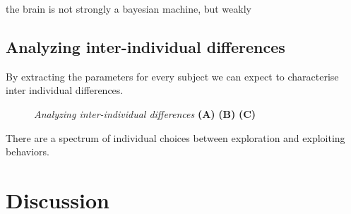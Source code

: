 \documentclass[profile,final,english, draft]{article}%
\begin{document}
the brain is not strongly a bayesian machine, but weakly



\subsection{Analyzing inter-individual differences}

By extracting the parameters for every subject we can expect to characterise inter individual differences.

\begin{figure}%
\caption{\emph{Analyzing inter-individual differences} \textbf{(A)}
\textbf{(B)}
\textbf{(C)}  }
\label{fig:results_psycho_inter}
\end{figure}

There are a spectrum of individual choices between exploration and exploiting behaviors.



\section{Discussion}
\end{document}
